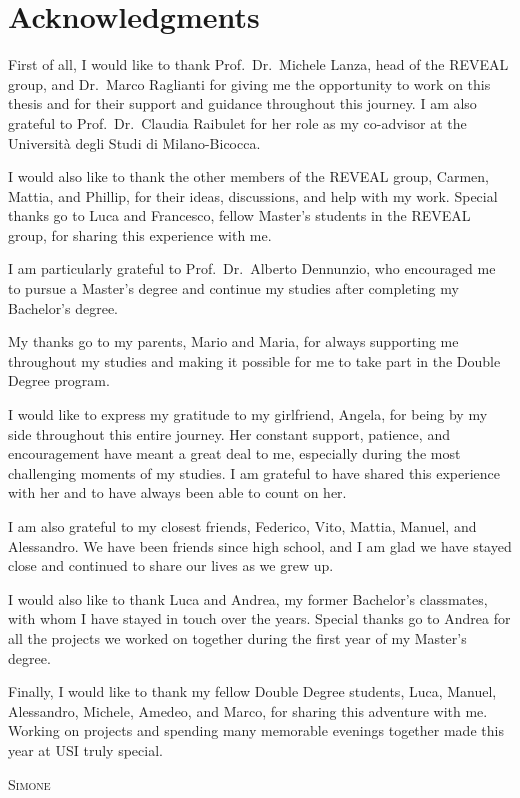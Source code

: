 \documentclass[../main.tex]{subfiles}
\begin{document}
\chapter*{Acknowledgments}

First of all, I would like to thank Prof.~Dr.~Michele Lanza, head of the REVEAL group, and Dr.~Marco Raglianti for giving me the opportunity to work on this thesis and for their support and guidance throughout this journey. I am also grateful to Prof.~Dr.~Claudia Raibulet for her role as my co-advisor at the Università degli Studi di Milano-Bicocca.

I would also like to thank the other members of the REVEAL group, Carmen, Mattia, and Phillip, for their ideas, discussions, and help with my work. Special thanks go to Luca and Francesco, fellow Master's students in the REVEAL group, for sharing this experience with me.

I am particularly grateful to Prof.~Dr.~Alberto Dennunzio, who encouraged me to pursue a Master's degree and continue my studies after completing my Bachelor's degree.

My thanks go to my parents, Mario and Maria, for always supporting me throughout my studies and making it possible for me to take part in the Double Degree program.

I would like to express my gratitude to my girlfriend, Angela, for being by my side throughout this entire journey. Her constant support, patience, and encouragement have meant a great deal to me, especially during the most challenging moments of my studies. I am grateful to have shared this experience with her and to have always been able to count on her.

I am also grateful to my closest friends, Federico, Vito, Mattia, Manuel, and Alessandro. We have been friends since high school, and I am glad we have stayed close and continued to share our lives as we grew up.

I would also like to thank Luca and Andrea, my former Bachelor's classmates, with whom I have stayed in touch over the years. Special thanks go to Andrea for all the projects we worked on together during the first year of my Master's degree.

Finally, I would like to thank my fellow Double Degree students, Luca, Manuel, Alessandro, Michele, Amedeo, and Marco, for sharing this adventure with me. Working on projects and spending many memorable evenings together made this year at USI truly special.

\vspace{0.35cm}
\begin{flushright}
    \textsc{Simone}
\end{flushright}
\end{document}
